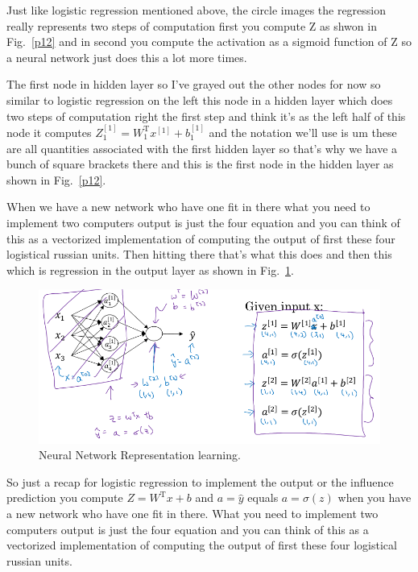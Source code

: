 \documentclass[a4paper]{article}
\begin{document}
Just like logistic regression mentioned above, the circle images the regression really represents two steps of computation first you compute Z as  shwon in Fig.~\ref{p12} and in second you compute the activation as a sigmoid function of Z so a neural network just does this a lot more times. 
 
The first node in hidden layer so I've grayed out the other nodes for now so similar to logistic regression on the left this node in a hidden layer which  does two steps of computation right the first step and think it's as the left half of this node it computes $Z^{[1]}_1=W_1^\mathrm{T}x^{[1]}+b_1^{[1]}$ and the notation we'll use is um these are all quantities associated with the first hidden layer so that's why we have a bunch of square brackets there and this is the first node in the hidden layer as shown in Fig.~\ref{p12}.

When we have a new network who have one fit in there what you need to implement two computers output is just the four equation and you can think of this as a vectorized implementation of computing the output of first these four logistical russian units. Then hitting there that's what this does and then this which is regression in the output layer as shown in Fig.~\ref{p13}.
 \begin{figure}
 	\begin{center}
 		\includegraphics[scale=0.4]{figures/15.png}
 	\end{center}
 	\caption{Neural Network Representation learning.}
 	\label{p13}
 \end{figure}

So just a recap for logistic regression to implement the output or the influence prediction you compute $Z=W^\mathrm{T}x+b$ and $a=\hat{y}$ equals $a=\sigma(z)$ when you have a new network who have one fit in there. What you need to implement two computers output is just the four equation and you can think of this as a vectorized implementation of computing the output of first these four logistical russian units.
\end{document}
